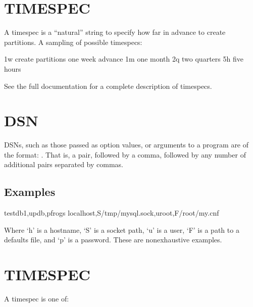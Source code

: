 \documentclass[letterpaper,10pt,english]{sphinxmanual}
\begin{document}
\section{TIMESPEC}
\label{\detokenize{mariadb-parted:timespec}}
\sphinxAtStartPar
A timespec is a “natural” string to specify how far in advance to create
partitions. A sampling of possible timespecs:

\begin{sphinxVerbatim}[commandchars=\\\{\}]
1w create partitions one week  advance
1m one month
2q two quarters
5h five hours
\end{sphinxVerbatim}

\sphinxAtStartPar
See the full documentation for a complete description of timespecs.


\section{DSN}
\label{\detokenize{mariadb-parted:dsn}}
\sphinxAtStartPar
DSNs, such as those passed as option values, or arguments to a program
are of the format: . That is, a  pair, followed
by a comma, followed by any number of additional  pairs separated by
commas.


\subsection{Examples}
\label{\detokenize{mariadb-parted:id1}}
\begin{sphinxVerbatim}[commandchars=\\\{\}]
testdb1,updb,pfrogs
localhost,S/tmp/mysql.sock,uroot,F/root/my.cnf
\end{sphinxVerbatim}

\sphinxAtStartPar
Where ‘h’ is a hostname, ‘S’ is a socket path, ‘u’ is a user, ‘F’ is a path
to a defaults file, and ‘p’ is a password. These are non\sphinxhyphen{}exhaustive examples.


\section{TIMESPEC}
\label{\detokenize{mariadb-parted:id2}}
\sphinxAtStartPar
A timespec is one of:
\end{document}
